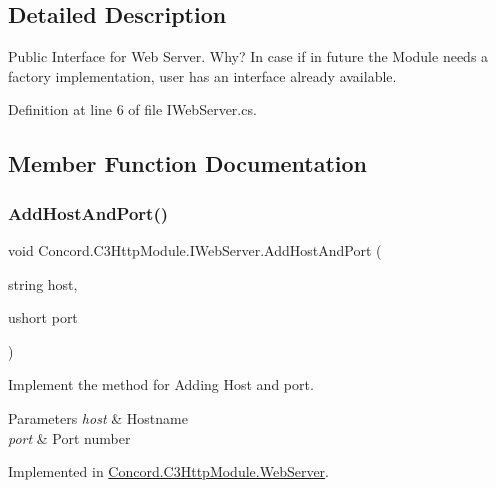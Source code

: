 \subsection{Detailed Description}
Public Interface for Web Server. Why? In case if in future the Module needs a factory implementation, user has an interface already available. 



Definition at line 6 of file I\+Web\+Server.\+cs.



\subsection{Member Function Documentation}
\mbox{\label{interface_concord_1_1_c3_http_module_1_1_i_web_server_aa89c81f517e7081af15505ef4d5a7083}} 
\subsubsection{\texorpdfstring{AddHostAndPort()}{AddHostAndPort()}}
{\footnotesize\ttfamily void Concord.\+C3\+Http\+Module.\+I\+Web\+Server.\+Add\+Host\+And\+Port (\begin{DoxyParamCaption}\item[{string}]{host,  }\item[{ushort}]{port }\end{DoxyParamCaption})}



Implement the method for Adding Host and port. 


\begin{DoxyParams}{Parameters}
{\em host} & Hostname\\
\hline
{\em port} & Port number\\
\hline
\end{DoxyParams}


Implemented in \mbox{\hyperlink{class_concord_1_1_c3_http_module_1_1_web_server_a3a0d02f87177a358cdf1442828829221}{Concord.\+C3\+Http\+Module.\+Web\+Server}}.

\mbox{\label{interface_concord_1_1_c3_http_module_1_1_i_web_server_a4ebea56f3b1910ddf812d80045dbc6f2}} 
